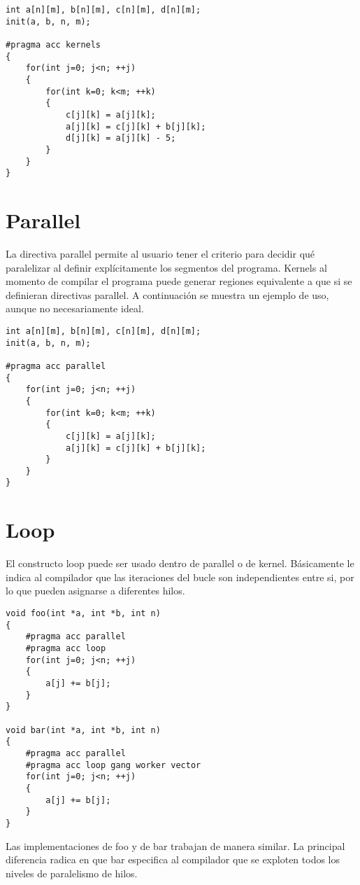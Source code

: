 \begin{lstlisting}[style=CStyle]
int a[n][m], b[n][m], c[n][m], d[n][m];
init(a, b, n, m);

#pragma acc kernels
{
    for(int j=0; j<n; ++j)
    {
        for(int k=0; k<m; ++k)
        {
            c[j][k] = a[j][k];
            a[j][k] = c[j][k] + b[j][k];
            d[j][k] = a[j][k] - 5;
        }
    }
}
\end{lstlisting}

\section{Parallel}
La directiva parallel permite al usuario tener el criterio para decidir qué paralelizar al definir explícitamente los segmentos del programa. Kernels al momento de compilar el programa puede generar regiones equivalente a que si se definieran directivas parallel. A continuación se muestra un ejemplo de uso, aunque no necesariamente ideal.

\begin{lstlisting}[style=CStyle]
int a[n][m], b[n][m], c[n][m], d[n][m];
init(a, b, n, m);

#pragma acc parallel
{
    for(int j=0; j<n; ++j)
    {
        for(int k=0; k<m; ++k)
        {
            c[j][k] = a[j][k];
            a[j][k] = c[j][k] + b[j][k];
        }
    }
}
\end{lstlisting}

\section{Loop}
El constructo loop puede ser usado dentro de parallel o de kernel. Básicamente le indica al compilador que las iteraciones del bucle son independientes entre si, por lo que pueden asignarse a diferentes hilos.

\begin{lstlisting}[style=CStyle]
void foo(int *a, int *b, int n)
{
    #pragma acc parallel
    #pragma acc loop
    for(int j=0; j<n; ++j)
    {
        a[j] += b[j];
    }
}

void bar(int *a, int *b, int n)
{
    #pragma acc parallel
    #pragma acc loop gang worker vector
    for(int j=0; j<n; ++j)
    {
        a[j] += b[j];
    }
}

\end{lstlisting}

Las implementaciones de foo y de bar trabajan de manera similar. La principal diferencia radica en que bar especifica al compilador que se exploten todos los niveles de paralelismo de hilos.

